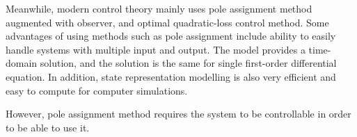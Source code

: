 \documentclass[a4paper, 12pt]{article}
\begin{document}
Meanwhile, modern control theory mainly uses pole assignment method augmented with observer, and optimal quadratic-loss control method. Some advantages of using methods such as pole assignment include ability to easily handle systems with multiple input and output. The model provides a time-domain solution, and the solution is the same for single first-order differential equation. In addition, state representation modelling is also very efficient and easy to compute for computer simulations.

However, pole assignment method requires the system to be controllable in order to be able to use it.



\end{document}
